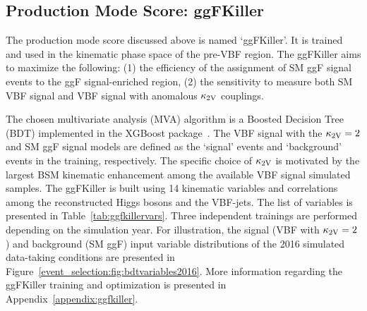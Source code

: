 \subsection{Production Mode Score: ggFKiller} \label{subsection:ggfkiller}
The production mode score discussed above is named `ggFKiller'. It is trained and used in the kinematic phase space of the pre-VBF region. The ggFKiller aims to maximize the following: (1) the efficiency of the assignment of SM ggF signal events to the ggF signal-enriched region, (2) the sensitivity to measure both SM VBF signal and VBF signal with anomalous $\mathrm{\kappa_{2V} }$ couplings. 

The chosen multivariate analysis (MVA) algorithm is a Boosted Decision Tree (BDT) implemented in the XGBoost package~\cite{xgboost}. The VBF signal with the $\mathrm{\kappa_{2V} } = 2$ and SM ggF signal models are defined as the `signal' events and `background' events in the training, respectively. The specific choice of $\mathrm{\kappa_{2V} }$ is motivated by the largest BSM kinematic enhancement among the available VBF signal simulated samples.  The ggFKiller is built using 14 kinematic variables and correlations among the reconstructed Higgs bosons and the VBF-jets. The list of variables is presented in Table~\ref{tab:ggfkillervars}. Three independent trainings are performed depending on the simulation year. For illustration, the signal (VBF with $\mathrm{\kappa_{2V} }=2$) and background (SM ggF) input variable distributions of the 2016 simulated data-taking conditions are presented in Figure~\ref{event_selection:fig:bdtvariables2016}. More information regarding the ggFKiller training and optimization is presented in Appendix~\ref{appendix:ggfkiller}.

\clearpage

